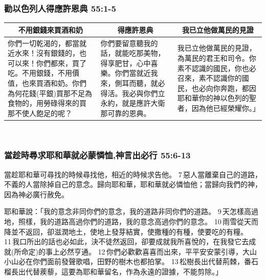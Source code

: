 \subsubsection{勸以色列人得應許恩典 55:1-5}
\begin{table}[H]
\centering
\begin{tabular}{p{}|p{4.75cm}|p{5.75cm}}\hline\hline
\multicolumn{1}{c|}{不用銀錢來買酒和奶}&\multicolumn{1}{c}{得應許恩典}&\multicolumn{1}{c}{我已立他做萬民的見證}\\\hline
你們一切乾渴的，都當就近水來！沒有銀錢的，也可以來！你們都來，買了吃。不用銀錢，不用價值，也來買酒和奶。你們為何花錢(平銀)買那不足為食物的，用勞碌得來的買那不使人飽足的呢？&你們要留意聽我的話，就能吃那美物，得享肥甘，心中喜樂。你們當就近我來，側耳而聽，就必得活。我必與你們立永約，就是應許大衛那可靠的恩典。&我已立他做萬民的見證，為萬民的君王和司令。你素不認識的國民，你也必召來，素不認識你的國民，也必向你奔跑，都因耶和華你的神以色列的聖者，因為他已經榮耀你。」\\\hline
\end{tabular}
\end{table} 



\subsubsection{當趁時尋求耶和華就必蒙憐恤,神言出必行 55:6-13}
當趁耶和華可尋找的時候尋找他，相近的時候求告他。 7 惡人當離棄自己的道路，不義的人當除掉自己的意念。歸向耶和華，耶和華就必憐恤他；當歸向我們的神，因為神必廣行赦免。

耶和華說：「我的意念非同你們的意念，我的道路非同你們的道路。 9 天怎樣高過地，照樣，我的道路高過你們的道路，我的意念高過你們的意念。 10 雨雪從天而降並不返回，卻滋潤地土，使地上發芽結實，使撒種的有種，使要吃的有糧。 11 我口所出的話也必如此，決不徒然返回，卻要成就我所喜悅的，在我發它去成就(所命定)的事上必然亨通。 12 你們必歡歡喜喜而出來，平平安安蒙引導，大山小山必在你們面前發聲歌唱，田野的樹木也都拍掌。 13 松樹長出代替荊棘，番石榴長出代替蒺藜，這要為耶和華留名，作為永遠的證據，不能剪除。」

